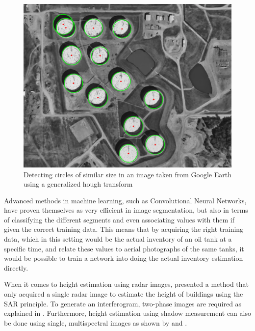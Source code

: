 \begin{figure}[!h]
	\centering
	\includegraphics[scale=0.4]{fig/hough_transform_circles.png}
	\caption{Detecting circles of similar size in an image taken from Google Earth using a generalized hough transform}
	\label{fig:houghtransformcircles}
\end{figure}

Advanced methods in machine learning, such as Convolutional Neural Networks, have proven themselves as very efficient in image segmentation, but also in terms of classifying the different segments and even associating values with them if given the correct training data. This means that by acquiring the right training data, which in this setting would be the actual inventory of an oil tank at a specific time, and relate these values to aerial photographs of the same tanks, it would be possible to train a network into doing the actual inventory estimation directly.

When it comes to height estimation using radar images, \cite{Brunner2008} presented a method that only acquired a single radar image to estimate the height of buildings using the SAR principle. To generate an interferogram, two-phase images are required as explained in \cite{Liu2015}. Furthermore, height estimation using shadow measurement can also be done using single, multispectral images as shown by \cite{Comber2012} and \cite{Shao2011}.

